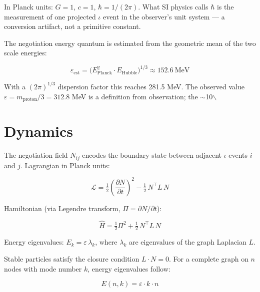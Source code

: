 \documentclass[11pt,letterpaper]{article}
\begin{document}
In Planck units: \(G = 1\), \(c = 1\), \(\hbar = 1/(2\pi)\). What SI physics calls \(\hbar\) is the measurement of one projected \(\iota\) event in the observer's unit system --- a conversion artifact, not a primitive constant.

The negotiation energy quantum is estimated from the geometric mean of the two scale energies:

\begin{equation}
\varepsilon_\text{est} = \bigl(E_\text{Planck}^2 \cdot E_\text{Hubble}\bigr)^{1/3} \approx 152.6\ \text{MeV}
\end{equation}

With a \((2\pi)^{1/3}\) dispersion factor this reaches 281.5 MeV. The observed value \(\varepsilon = m_\text{proton}/3 = 312.8\) MeV is a definition from observation; the \(\sim\)10$\backslash$%

\section{Dynamics}
\label{sec:org9eb0cb3}

The negotiation field \(N_{ij}\) encodes the boundary state between adjacent \(\iota\) events \(i\) and \(j\). Lagrangian in Planck units:

\begin{equation}
\mathcal{L} = \tfrac{1}{2}\!\left(\frac{\partial N}{\partial t}\right)^{\!2} - \tfrac{1}{2}\,N^\top L\, N
\end{equation}

Hamiltonian (via Legendre transform, \(\Pi = \partial N/\partial t\)):

\begin{equation}
\hat{H} = \tfrac{1}{2}\Pi^2 + \tfrac{1}{2}\,N^\top L\, N
\end{equation}

Energy eigenvalues: \(E_k = \varepsilon\,\lambda_k\), where \(\lambda_k\) are eigenvalues of the graph Laplacian \(L\).

Stable particles satisfy the closure condition \(L \cdot N = 0\). For a complete graph on \(n\) nodes with mode number \(k\), energy eigenvalues follow:

\begin{equation}
E(n,k) = \varepsilon \cdot k \cdot n
\end{equation}
\end{document}
